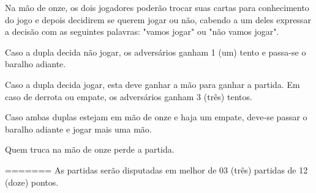 \begin{article}
	Na mão de onze, os dois jogadores poderão trocar suas cartas para conhecimento do jogo e depois decidirem se querem jogar ou não, cabendo a um deles expressar a decisão com as seguintes palavras: "vamos jogar" ou "não vamos jogar".

	\begin{xparagraph}
		Caso a dupla decida não jogar, os adversários ganham 1 (um) tento e passa-se o baralho adiante.
	\end{xparagraph}

	\begin{xparagraph}
		Caso a dupla decida jogar, esta deve ganhar a mão para ganhar a partida. Em caso de derrota ou empate, os adversários ganham 3 (três) tentos.
	\end{xparagraph}

	\begin{xparagraph}
		Caso ambas duplas estejam em mão de onze e haja um empate, deve-se passar o baralho adiante e jogar mais uma mão.
	\end{xparagraph}

	\begin{xparagraph}
		Quem truca na mão de onze perde a partida.
	\end{xparagraph}
=======
	As partidas serão disputadas em melhor de 03 (três) partidas de 12 (doze) pontos.
\end{article}

